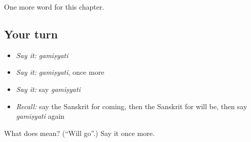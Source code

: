 \begin{grammarlens}[title={What you've built}]
One more word for this chapter.
\end{grammarlens}

\subsection*{Your turn}
\begin{itemize}
\raggedright
  \item \emph{Say it:} \emph{gamiṣyati}
  \item \emph{Say it:} \emph{gamiṣyati}, once more
  \item \emph{Say it:} say \emph{gamiṣyati}
  \item \emph{Recall:} say the Sanskrit for coming, then the Sanskrit for will be, then say \emph{gamiṣyati} again
\end{itemize}

\begin{tcolorbox}[breakable,colback=teal!4,colframe=teal!35!black,title={Before you move on}]
What does  mean? (\textquotedblleft{}Will go\textquotedblright{}.) Say it once more.
\end{tcolorbox}
